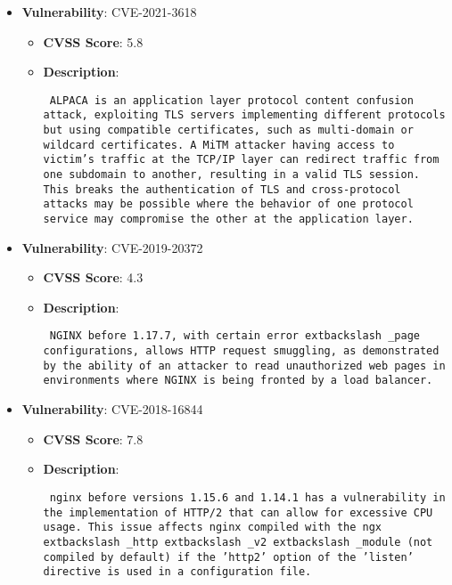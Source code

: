 \documentclass{article}
\begin{document}
\begin{itemize}
        \item \textbf{Vulnerability}: CVE-2021-3618
        \begin{itemize}
            \item \textbf{CVSS Score}:  5.8 
            \item \textbf{Description}: \parbox{\linewidth}{\texttt{ ALPACA is an application layer protocol content confusion attack, exploiting TLS servers implementing different protocols but using compatible certificates, such as multi-domain or wildcard certificates. A MiTM attacker having access to victim's traffic at the TCP/IP layer can redirect traffic from one subdomain to another, resulting in a valid TLS session. This breaks the authentication of TLS and cross-protocol attacks may be possible where the behavior of one protocol service may compromise the other at the application layer. }}
        \end{itemize}
    
        \item \textbf{Vulnerability}: CVE-2019-20372
        \begin{itemize}
            \item \textbf{CVSS Score}:  4.3 
            \item \textbf{Description}: \parbox{\linewidth}{\texttt{ NGINX before 1.17.7, with certain error	extbackslash _page configurations, allows HTTP request smuggling, as demonstrated by the ability of an attacker to read unauthorized web pages in environments where NGINX is being fronted by a load balancer. }}
        \end{itemize}
    
        \item \textbf{Vulnerability}: CVE-2018-16844
        \begin{itemize}
            \item \textbf{CVSS Score}:  7.8 
            \item \textbf{Description}: \parbox{\linewidth}{\texttt{ nginx before versions 1.15.6 and 1.14.1 has a vulnerability in the implementation of HTTP/2 that can allow for excessive CPU usage. This issue affects nginx compiled with the ngx	extbackslash _http	extbackslash _v2	extbackslash _module (not compiled by default) if the 'http2' option of the 'listen' directive is used in a configuration file. }}
        \end{itemize}
    

\end{itemize}
\end{document}
